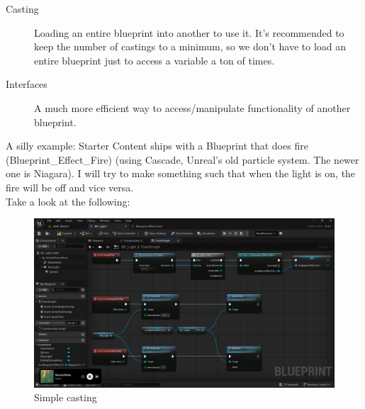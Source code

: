 \documentclass[]{article}
\begin{document}
	\begin{description}
		\item[Casting] Loading an entire blueprint into another to use it. It's recommended to keep the number of castings to a minimum, so we don't have to load an entire blueprint just to access a variable a ton of times.
		\item[Interfaces] A much more efficient way to access/manipulate functionality of another blueprint. 
	\end{description}
	
	A silly example: Starter Content ships with a Blueprint that does fire (Blueprint\_Effect\_Fire) (using Cascade, Unreal's old particle system. The newer one is Niagara). I will try to make something such that when the light is on, the fire will be off and vice versa. 
	\\[10pt]
	Take a look at the following:
	\begin{figure}[h]
		\centering
		\includegraphics[width=1\linewidth]{week2part2/screenshot017}
		\caption{Simple casting}
		\label{fig:screenshot017}
	\end{figure}
	
	
	
\end{document}
